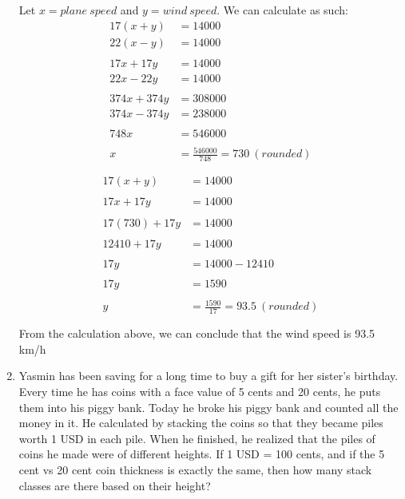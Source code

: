 \documentclass[12pt,titlepage]{article}
\begin{document}
\begin{enumerate}
{        Let $x=plane~speed$ and $y=wind~speed$. We can calculate as such:
        \begin{align*}
            17(x+y) &= 14000 \\
            22(x-y) &= 14000 \\~\\
            17x + 17y &= 14000 \\
            22x - 22y &= 14000 \\~\\
            374x + 374y &= 308000 \\
            374x - 374y &= 238000 \\~\\
            748x &= 546000 \\~\\
            x &= \frac{546000}{748} = 730~(rounded) \\~\\
        \end{align*}
        \begin{align*}
            17(x+y) &= 14000 \\~\\
            17x + 17y &= 14000 \\~\\
            17(730) + 17y &= 14000 \\~\\
            12410 + 17y &= 14000 \\~\\
            17y &= 14000 - 12410 \\~\\
            17y &= 1590 \\~\\
              y &= \frac{1590}{17} = 93.5~(rounded) \\~\\
        \end{align*}
        From the calculation above, we can conclude that the wind speed is 93.5 km/h
    }
    \pagebreak
    \item {
        Yasmin has been saving for a long time to buy a gift for her sister's birthday. Every time he has coins with a
        face value of 5 cents and 20 cents, he puts them into his piggy bank. Today he broke his piggy bank and counted
        all the money in it. He calculated by stacking the coins so that they became piles worth 1 USD in each pile.
        When he finished, he realized that the piles of coins he made were of different heights. If 1 USD = 100
        cents, and if the 5 cent vs 20 cent coin thickness is exactly the same, then how many stack classes are there
        based on their height?

}
\end{enumerate}
\end{document}
